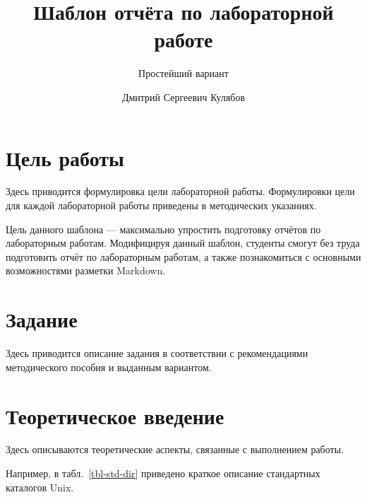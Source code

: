 \documentclass[
  english,
  russian,
  12pt,
  a4paper,
  DIV=11,
  numbers=noendperiod]{scrreprt}
\title{Шаблон отчёта по лабораторной работе}
\subtitle{Простейший вариант}
\author{Дмитрий Сергеевич Кулябов}
\date{}
\renewcommand*\contentsname{Содержание}
\newcommand\contentsname{Содержание}
\begin{document}
\maketitle

\renewcommand*\contentsname{Содержание}
{
\setcounter{tocdepth}{1}
\tableofcontents
}
\listoffigures
\listoftables

\chapter{Цель
работы}\label{ux446ux435ux43bux44c-ux440ux430ux431ux43eux442ux44b}

Здесь приводится формулировка цели лабораторной работы. Формулировки
цели для каждой лабораторной работы приведены в методических указаниях.

Цель данного шаблона --- максимально упростить подготовку отчётов по
лабораторным работам. Модифицируя данный шаблон, студенты смогут без
труда подготовить отчёт по лабораторным работам, а также познакомиться с
основными возможностями разметки Markdown.

\chapter{Задание}\label{ux437ux430ux434ux430ux43dux438ux435}

Здесь приводится описание задания в соответствии с рекомендациями
методического пособия и выданным вариантом.

\chapter{Теоретическое
введение}\label{ux442ux435ux43eux440ux435ux442ux438ux447ux435ux441ux43aux43eux435-ux432ux432ux435ux434ux435ux43dux438ux435}

Здесь описываются теоретические аспекты, связанные с выполнением работы.

Например, в табл.~\ref{tbl-std-dir} приведено краткое описание
стандартных каталогов Unix.
\end{document}
